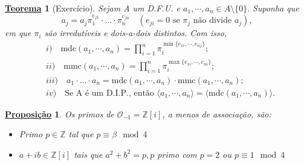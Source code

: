 \documentclass{article}
\newtheorem*{theorem*}{\underline{Teorema}}
\newtheorem*{prop*}{\underline{Proposi\c c\~ao}}
\begin{document}
\begin{theorem*}[Exercício]
  Sejam A um D.F.U. e \(a_{1}, \cdots, a_{n}\in A\setminus{\{0\}}.\) Suponha que 
  \[
    a_{j} = a_{j}\pi_{1}^{e_{j1}}\cdot\dotsc \cdot \pi_{n}^{e_{jn}} \quad (e_{ji} = 0 \text{ se } \pi_{j} \text{ não divide } a_{j}),
  \]
  em que \(\pi_{i}\) são irredutíveis e dois-a-dois distintos. Com isso, 
  \begin{align*}
    &i)\quad\mathrm{mdc}(a_{1},\cdots,a_{n}) = \prod\limits_{i=1}^{n}\pi_{i}^{\min\{e_{1i}, \cdots, e_{nj}\}};\\
    &ii)\quad \mathrm{mmc}(a_{1}, \cdots, a_{n}) = \prod\limits_{i=1}^{n}\pi_{i}^{\max\{e_{1i}, \cdots, e_{ni}\}};\\
    &iii)\quad a_{1}\cdot \dotsc \cdot  a_{n} = \mathrm{mdc}(a_{1}, \cdots, a_{n})\cdot \mathrm{mmc}(a_{1}, \cdots, a_{n});\\
    &iv)\quad \text{Se A é um D.I.P., então }  \langle a_{1}, \cdots, a_{n} \rangle = \langle \mathrm{mdc}(a_{1}, \cdots, a_{n}) \rangle.
  \end{align*}
\end{theorem*}
\begin{prop*}
  Os primos de \(\mathcal{O}_{-1} = \mathbb{Z}[i]\), a menos de associação, são:
 \begin{itemize}
  \item[1)] Primo \(p\in \mathbb{Z}\) tal que \(p\equiv \beta  \mod 4\)
  \item[2)] \(a+ib\in \mathbb{Z}[i]\) tais que \(a^{2} + b^{2} = p, p\) primo com \(p = 2\) ou \(p\equiv 1 \mod 4\)
 \end{itemize}
\end{prop*}
\end{document}

